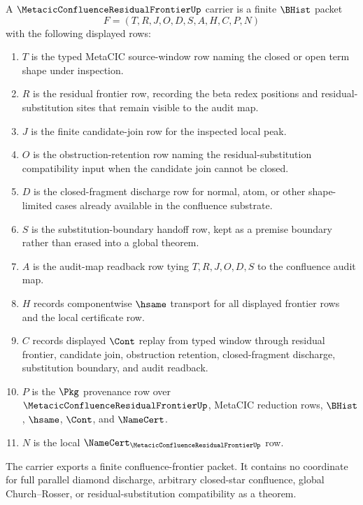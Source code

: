 \begin{definition}
\label{def:metacic-confluence-residual-frontier-carrier}
A $\MetacicConfluenceResidualFrontierUp$ carrier is a finite $\BHist$ packet
$$
F=(T,R,J,O,D,S,A,H,C,P,N)
$$
with the following displayed rows:
\begin{enumerate}
\item $T$ is the typed MetaCIC source-window row naming the closed or open term shape under inspection.
\item $R$ is the residual frontier row, recording the beta redex positions and residual-substitution sites that remain visible to the audit map.
\item $J$ is the finite candidate-join row for the inspected local peak.
\item $O$ is the obstruction-retention row naming the residual-substitution compatibility input when the candidate join cannot be closed.
\item $D$ is the closed-fragment discharge row for normal, atom, or other shape-limited cases already available in the confluence substrate.
\item $S$ is the substitution-boundary handoff row, kept as a premise boundary rather than erased into a global theorem.
\item $A$ is the audit-map readback row tying $T,R,J,O,D,S$ to the confluence audit map.
\item $H$ records componentwise $\hsame$ transport for all displayed frontier rows and the local certificate row.
\item $C$ records displayed $\Cont$ replay from typed window through residual frontier, candidate join, obstruction retention, closed-fragment discharge, substitution boundary, and audit readback.
\item $P$ is the $\Pkg$ provenance row over $\MetacicConfluenceResidualFrontierUp$, MetaCIC reduction rows, $\BHist$, $\hsame$, $\Cont$, and $\NameCert$.
\item $N$ is the local $\NameCert_{\MetacicConfluenceResidualFrontierUp}$ row.
\end{enumerate}
The carrier exports a finite confluence-frontier packet. It contains no coordinate for full parallel diamond discharge, arbitrary closed-star confluence, global Church--Rosser, or residual-substitution compatibility as a theorem.
\end{definition}

